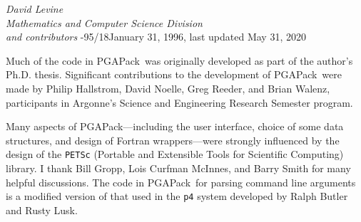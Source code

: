 \documentclass{report}
\newcommand{\pga}{PGAPack}
\begin{document}
{\em David Levine\\[.1in]
Mathematics and Computer Science Division\\[.1in]
and contributors
}{-95/18}{January 31, 1996, last updated May 31, 2020}



\date{\today}

\newpage


Much of the code in \pga\ was originally developed as part of the author's
Ph.D. thesis.  Significant contributions to the development of
\pga\ were made by Philip Hallstrom, David Noelle, Greg Reeder, and Brian
Walenz, participants in Argonne's Science and Engineering Research Semester
program.

Many aspects of \pga---including the user interface, choice of some data
structures, and design of Fortran wrappers---were strongly influenced by the
design of the {\tt PETSc} (Portable and Extensible Tools for Scientific
Computing) library.
I thank Bill Gropp, Lois Curfman McInnes, and Barry Smith
for many helpful discussions.  The code in \pga\ for parsing command line
arguments is a modified version of that used in the {\tt p4} system
developed by Ralph Butler and  Rusty Lusk.

\newpage
\end{document}
